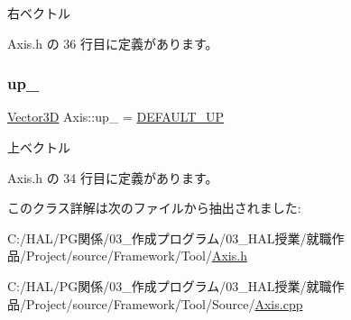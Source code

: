 右ベクトル 



 Axis.\+h の 36 行目に定義があります。

\mbox{\label{class_axis_a7a09c9a41bd3576b12a7564e6aad7cb6}} 
\subsubsection{\texorpdfstring{up\+\_\+}{up\_}}
{\footnotesize\ttfamily \mbox{\hyperlink{class_vector3_d}{Vector3D}} Axis\+::up\+\_\+ = \mbox{\hyperlink{class_axis_afe3787d2e4c4affc0c4ab43a5f52891e}{D\+E\+F\+A\+U\+L\+T\+\_\+\+UP}}\hspace{0.3cm}{\ttfamily [private]}}



上ベクトル 



 Axis.\+h の 34 行目に定義があります。



このクラス詳解は次のファイルから抽出されました\+:\begin{DoxyCompactItemize}
\item 
C\+:/\+H\+A\+L/\+P\+G関係/03\+\_\+作成プログラム/03\+\_\+\+H\+A\+L授業/就職作品/\+Project/source/\+Framework/\+Tool/\mbox{\hyperlink{_axis_8h}{Axis.\+h}}\item 
C\+:/\+H\+A\+L/\+P\+G関係/03\+\_\+作成プログラム/03\+\_\+\+H\+A\+L授業/就職作品/\+Project/source/\+Framework/\+Tool/\+Source/\mbox{\hyperlink{_axis_8cpp}{Axis.\+cpp}}\end{DoxyCompactItemize}
